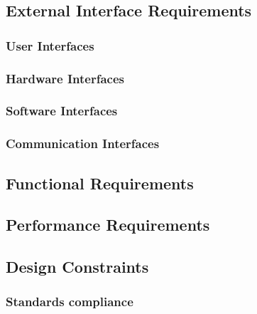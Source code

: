
\subsection{External Interface Requirements}

\subsubsection{User Interfaces}


\subsubsection{Hardware Interfaces}

\subsubsection{Software Interfaces}

\subsubsection{Communication Interfaces}


\subsection{Functional Requirements}




\subsection{Performance Requirements}


\subsection{Design Constraints}

\subsubsection{Standards compliance}


